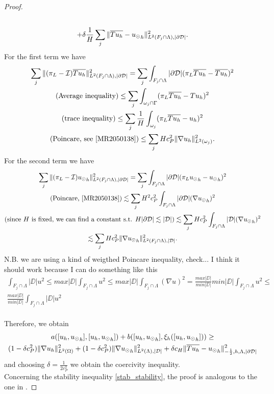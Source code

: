 \begin{proof}
\begin{multline*}
\\ 
+ \delta \frac 1H \sum_j \|\overline{Tu_h}-{u_{\odot}}_h\|^2_{L^2(F_j\cap \Lambda),|\partial\mathcal{D}|}. 
\end{multline*}
For the first term we have
\begin{multline*}
\sum _j  \|(\pi_L - \mathcal{I})\avrc{Tu_h}\|^2_{L^2(F_j\cap \Lambda),|\DD|} =\sum _j \int _{F_j \cap \Lambda} |\DD| (\pi_L \avrc{Tu_h}- \avrc{Tu_h})^2
\\
(\text{Average inequality)} \leq \sum _j  \int_{\omega _j \cap \Gamma} (\pi_L \avrc{Tu_h} -Tu_h)^2 
\\
(\text{trace inequality}) \leq \sum _j  \frac 1H \int_{\omega_j}(\pi_L \avrc{Tu_h} - u_h)^2 
\\ 
(\text{Poincare, see \cite[Corollary B.65]{MR2050138}})\leq \sum _j  H c_P ^2 \|\nabla u_h\|^2_{L^2(\omega _j)}.
\end{multline*}
For the second term we have
\begin{multline*}
\sum _j \|(\pi_L - \mathcal{I}){\ud}_h\|^2_{L^2(F_j\cap \Lambda),|\DD|} = \sum _j \int_{F_j\cap \Lambda} |\DD| (\pi_L {\ud}_h -{\ud}_h)^2
\\
(\text{Poincare, \cite[Corollary B.65]{MR2050138}})\lesssim \sum _j  H^2 c_P^2 \int_{F_j\cap \Lambda} |\DD|(\nabla {\ud}_h)^2
\\
(\text{since $H$ is fixed, we can find a constant s.t. } H|\DD| \lesssim |\D|) \lesssim \sum _j H c_P^2  \int_{F_j\cap \Lambda} |\D|(\nabla {\ud}_h)^2 
\\
\lesssim \sum _j H c_P^2  \|\nabla {\ud}_h\|^2_{L^2(F_j\cap \Lambda),|\D|}.
\end{multline*}
{\color{red} N.B. we are using a kind of weigthed Poincare inequality, check... I think it should work because I can do something like this
\begin{multline*}
\int_{F_j \cap \Lambda} |\DD| u^2 \leq 
max |\DD| \int_{F_j \cap \Lambda} u^2 \leq
max |\DD| \int_{F_j \cap \Lambda} (\nabla u)^2 =
\frac{max |\DD|}{min|\DD|} min|\DD| \int_{F_j \cap \Lambda} u^2 \leq\\
\frac{max |\DD|}{min|\DD|}  \int_{F_j \cap \Lambda} |\DD| u^2 
\end{multline*}
}\\
Therefore, we obtain
\begin{multline*}
a([u_h, {u_{\odot}}_h],[u_h, {u_{\odot}}_h] ) + b([u_h, {u_{\odot}}_h], \xi_h([u_h, {u_{\odot}}_h]))
\geq \\
(1-\delta c_P^2) \|\nabla u_h\|^2_{L^2(\Omega)} + (1- \delta c_P^2) \|\nabla {u_{\odot}}_h\|^2_{L^2(\Lambda), |\mathcal{D}|}
+\delta c_H  \|\overline{Tu_h}-{u_{\odot}}_h\|^2_{-\frac 12,h,\Lambda, |\partial\mathcal{D}|}
\end{multline*}
and choosing $\delta=\frac{1}{2c_P^2}$ we obtain the coercivity inequality.\\
Concerning the stability inequality \eqref{stab_stability}, the proof is analogous to the one in \cite{burman2014}.
\end{proof}
